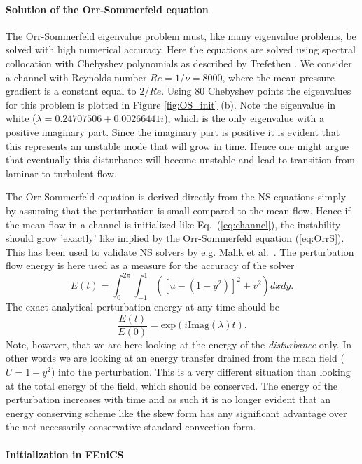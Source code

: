 \paragraph{Solution of the Orr-Sommerfeld equation}

The Orr-Sommerfeld eigenvalue problem must, like many eigenvalue problems, be solved with high numerical accuracy. Here the equations are solved using spectral collocation with Chebyshev polynomials as described by Trefethen \cite{Trefethen2006}. We consider a channel with Reynolds number $Re=1/\nu=8000$, where the mean pressure gradient is a constant equal to $2/Re$. Using 80 Chebyshev points the eigenvalues for this problem is plotted in Figure \ref{fig:OS_init} (b). Note the eigenvalue in white ($\lambda = 0.24707506+0.00266441 i$), which is the only eigenvalue with a positive imaginary part. Since the imaginary part is positive it is evident that this represents an unstable mode that will grow in time. Hence one might argue that eventually this disturbance will become unstable and lead to transition from laminar to turbulent flow.

The Orr-Sommerfeld equation is derived directly from the NS equations simply by assuming that the perturbation is small compared to the mean flow. Hence if the mean flow in a channel is initialized like Eq.~(\ref{eq:channel}), the instability should grow 'exactly' like implied by the Orr-Sommerfeld equation (\ref{eq:OrrS}). This has been used to validate NS solvers by e.g. Malik et al.~\cite{MalikZangHussaini1984}. The perturbation flow energy is here used as a measure for the accuracy of the solver
\begin{equation}
  E(t)= \int_0^{2\pi}\int_{-1}^{1} \left( \left[u-(1-y^2)\right]^2 + v^2 \right) dx dy.
\end{equation}
The exact analytical perturbation energy at any time should be
\[ \frac{E(t)}{E(0)}=\text{exp}(i \text{Imag}(\lambda) t).\]
Note, however, that we are here looking at the energy of the \textit{disturbance} only. In other words we are looking at an energy transfer drained from the mean field ($\overline{U}=1-y^2$) into the perturbation. This is a very different situation than looking at the total energy of the field, which should be conserved. The energy of the perturbation increases with time and as such it is no longer evident that an energy conserving scheme like the skew form has any significant advantage over the not necessarily conservative standard convection form.

\paragraph{Initialization in FEniCS}

